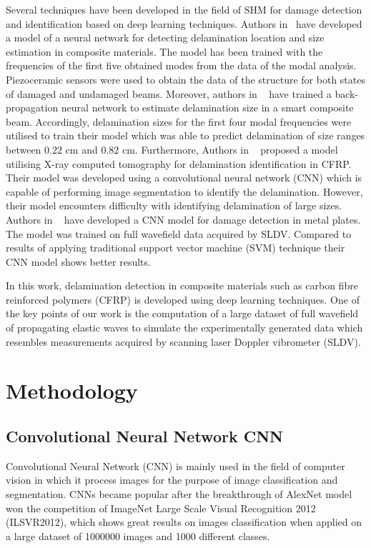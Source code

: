 \documentclass[10pt, twocolumn]{article} %
\begin{document}
	Several techniques have been developed in the field of SHM for damage detection and identification based on deep learning techniques.
	Authors in~\cite{islam1994damage} have developed a model of a neural network for detecting delamination location and size estimation in composite materials. 
	The model has been trained with the frequencies of the first five obtained modes from the data of the modal analysis. Piezoceramic sensors were used to obtain the data of the structure for both states of damaged and undamaged beams.
	Moreover, authors in ~\cite{okafor1996delamination} have trained a back-propagation neural network to estimate delamination size in a smart composite beam. 
	Accordingly, delamination sizes for the first four modal frequencies were utilised to train their model which was able to predict delamination of size ranges between \(0.22\) cm and \(0.82\) cm.
	Furthermore, Authors in ~\cite{Sammons2016} proposed a model utilising X-ray computed tomography for delamination identification in CFRP.  
	Their model was developed using a convolutional neural network (CNN) which is capable of performing image segmentation to identify the delamination.
	However, their model encounters difficulty with identifying delamination of large sizes.
	Authors in ~\cite{Melville2018} have developed a CNN model for damage detection in metal plates.
	The model was trained on full wavefield data acquired by SLDV. 
	Compared to results of applying traditional support vector machine (SVM) technique their CNN model shows better results.
		
	In this work, delamination detection in composite materials such as carbon fibre reinforced polymers (CFRP) is developed using deep learning techniques. One of the key points of our work is the computation of a large dataset of full wavefield of propagating elastic waves to simulate the experimentally generated data which resembles measurements acquired by scanning laser Doppler vibrometer (SLDV).
	\section{Methodology}
		\subsection{Convolutional Neural Network CNN}
		Convolutional Neural Network (CNN) is mainly used in the field of computer vision in which it process images for the purpose of image classification and segmentation.
		CNNs became popular after the breakthrough of AlexNet model~\cite{NIPS2012_4824} won the competition of ImageNet Large Scale Visual Recognition 2012 (ILSVR2012), which shows great results on images classification when applied on a large dataset of 1000000 images and 1000 different classes.
		
\end{document}
